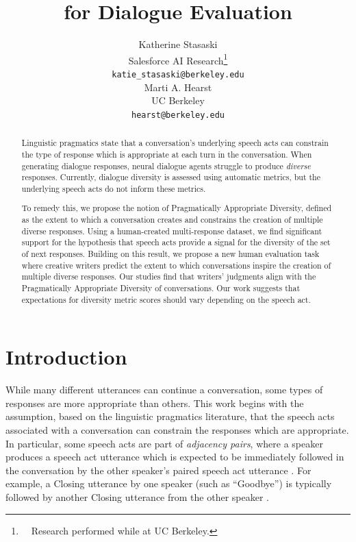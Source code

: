 \documentclass[11pt]{article}
\title{\edivspace for Dialogue Evaluation}
\author{Katherine Stasaski \\
  Salesforce AI Research\thanks{~~Research performed  while at UC Berkeley.}\\
  \texttt{katie\_stasaski@berkeley.edu}\\\And
  Marti A. Hearst \\
  UC Berkeley \\
  \texttt{hearst@berkeley.edu}}
\newcommand{\ediv}{Pragmatically Appropriate Diversity}
\newcommand{\edivspace}{Pragmatically Appropriate Diversity }
\begin{document}
\maketitle
\begin{abstract}
Linguistic pragmatics state that a conversation's underlying speech acts can constrain the type of response which is  appropriate at each turn in the conversation. 
When generating dialogue responses, neural dialogue agents struggle to produce \textit{diverse} responses.  Currently, dialogue diversity is assessed 
using automatic metrics, but the underlying speech acts do not  inform these  metrics.  

To remedy this, we propose the notion of \ediv, defined as the extent to which a conversation creates and constrains the creation of multiple diverse responses. 
Using a human-created multi-response dataset, we 
find significant support for the hypothesis that speech acts provide a signal for the diversity of the set of next responses.
Building on this result, we propose a new human evaluation task where creative writers predict the extent to which conversations inspire the creation of multiple diverse responses.  Our studies find  that   writers' judgments align with the \edivspace of  conversations.
Our work suggests that expectations for diversity metric scores should vary depending on the speech act.


\end{abstract}

\section{Introduction}

While many different   utterances can 
continue a conversation, some types of responses are more appropriate than others.
This work begins with the assumption, based on the linguistic pragmatics literature, that the speech acts associated with a conversation can constrain the responses which are  appropriate.  In particular, some speech acts are  part of \textit{adjacency pairs}, where a speaker produces a speech act utterance which is expected to be immediately followed in the conversation by the other speaker's paired speech act utterance \cite{levinson_1983}. For example, a Closing utterance by one speaker (such as ``Goodbye'') is typically followed by another Closing utterance from the other speaker \cite{schegloff}.  
\end{document}
